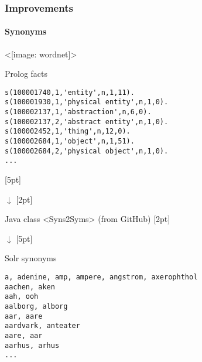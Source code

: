 \documentclass[table]{beamer}
\def\\{}
\def\texttt#1{<#1>}
\begin{document}
\begin{frame}[fragile]
\frametitle{Improvements}
\framesubtitle{Synonyms}

\small
\centering

\begin{minipage}[c]{0.40\textwidth}
\centering
    \texttt{[image: wordnet]}
\end{minipage}
\begin{minipage}[c]{0.40\textwidth}
\footnotesize
    Prolog facts
    \begin{lstlisting}
s(100001740,1,'entity',n,1,11).
s(100001930,1,'physical entity',n,1,0).
s(100002137,1,'abstraction',n,6,0).
s(100002137,2,'abstract entity',n,1,0).
s(100002452,1,'thing',n,12,0).
s(100002684,1,'object',n,1,51).
s(100002684,2,'physical object',n,1,0).
...
    \end{lstlisting}\end{minipage} \\[5pt]

    
{\large $\downarrow$} \\[2pt]

Java class \texttt{Syns2Syms} (from GitHub) \\[2pt]

{\large $\downarrow$} \\[5pt]

\begin{minipage}[c]{0.40\textwidth}
    \centering
\end{minipage}
\begin{minipage}[c]{0.40\textwidth}
\footnotesize
    Solr synonyms
    \begin{lstlisting}
a, adenine, amp, ampere, angstrom, axerophthol
aachen, aken
aah, ooh
aalborg, alborg
aar, aare
aardvark, anteater
aare, aar
aarhus, arhus
...
    \end{lstlisting}\end{minipage}

\end{frame}
\end{document}
